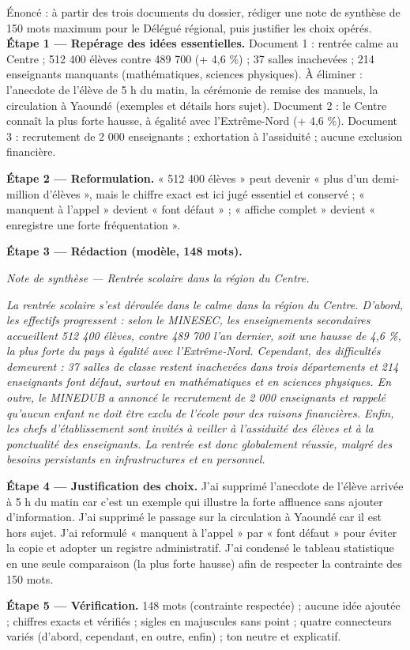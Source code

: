 \documentclass[11pt]{article}
\begin{document}
\begin{exoresolu}
Énoncé : à partir des trois documents du dossier, rédiger une note de synthèse de 150 mots maximum pour le Délégué régional, puis justifier les choix opérés.
\tcblower
\textbf{Étape 1 — Repérage des idées essentielles.} Document 1 : rentrée calme au Centre ; 512 400 élèves contre 489 700 (+ 4,6 \%) ; 37 salles inachevées ; 214 enseignants manquants (mathématiques, sciences physiques). À éliminer : l'anecdote de l'élève de 5 h du matin, la cérémonie de remise des manuels, la circulation à Yaoundé (exemples et détails hors sujet). Document 2 : le Centre connaît la plus forte hausse, à égalité avec l'Extrême-Nord (+ 4,6 \%). Document 3 : recrutement de 2 000 enseignants ; exhortation à l'assiduité ; aucune exclusion financière.

\textbf{Étape 2 — Reformulation.} « 512 400 élèves » peut devenir « plus d'un demi-million d'élèves », mais le chiffre exact est ici jugé essentiel et conservé ; « manquent à l'appel » devient « font défaut » ; « affiche complet » devient « enregistre une forte fréquentation ».

\textbf{Étape 3 — Rédaction (modèle, 148 mots).}

\emph{Note de synthèse — Rentrée scolaire dans la région du Centre.}

\emph{La rentrée scolaire s'est déroulée dans le calme dans la région du Centre. D'abord, les effectifs progressent : selon le MINESEC, les enseignements secondaires accueillent 512 400 élèves, contre 489 700 l'an dernier, soit une hausse de 4,6 \%, la plus forte du pays à égalité avec l'Extrême-Nord. Cependant, des difficultés demeurent : 37 salles de classe restent inachevées dans trois départements et 214 enseignants font défaut, surtout en mathématiques et en sciences physiques. En outre, le MINEDUB a annoncé le recrutement de 2 000 enseignants et rappelé qu'aucun enfant ne doit être exclu de l'école pour des raisons financières. Enfin, les chefs d'établissement sont invités à veiller à l'assiduité des élèves et à la ponctualité des enseignants. La rentrée est donc globalement réussie, malgré des besoins persistants en infrastructures et en personnel.}

\textbf{Étape 4 — Justification des choix.} J'ai supprimé l'anecdote de l'élève arrivée à 5 h du matin car c'est un exemple qui illustre la forte affluence sans ajouter d'information. J'ai supprimé le passage sur la circulation à Yaoundé car il est hors sujet. J'ai reformulé « manquent à l'appel » par « font défaut » pour éviter la copie et adopter un registre administratif. J'ai condensé le tableau statistique en une seule comparaison (la plus forte hausse) afin de respecter la contrainte des 150 mots.

\textbf{Étape 5 — Vérification.} 148 mots (contrainte respectée) ; aucune idée ajoutée ; chiffres exacts et vérifiés ; sigles en majuscules sans point ; quatre connecteurs variés (d'abord, cependant, en outre, enfin) ; ton neutre et explicatif.
\end{exoresolu}
\end{document}
